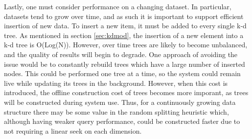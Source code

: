Lastly, one must consider performance on a changing dataset.  In particular, datasets tend to grow over time, and as such it is important to support efficient insertion of new data.  To insert a new item, it must be added to every single k-d tree.  As mentioned in section \ref{sec:kdmod}, the insertion of a new element into a k-d tree is O(Log(N)).  However, over time trees are likely to become unbalanced, and the quality of results will begin to degrade.  One approach of avoiding the issue would be to constantly rebuild trees which have a large number of inserted nodes.  This could be performed one tree at a time, so the system could remain live while updating its trees in the background.  However, when this cost is introduced, the offline construction cost of trees becomes more imporant, as trees will be constructed during system use.  Thus, for a continuously growing data structure there may be some value in the random splitting heuristic which, although having weaker query performance, could be constructed faster due to not requiring a linear seek on each dimension.

